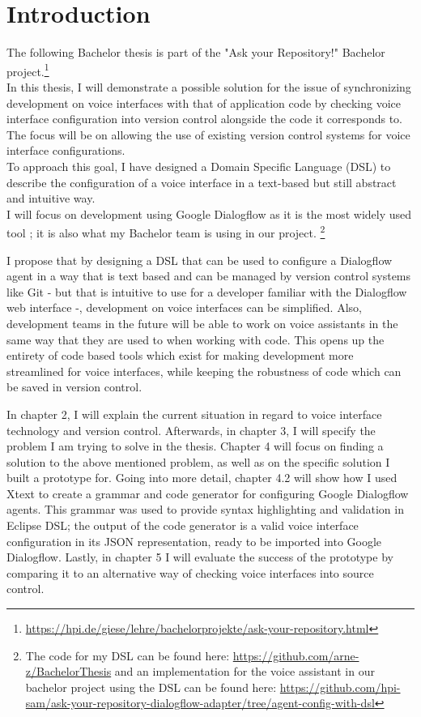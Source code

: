 
\chapter{Introduction}

The following Bachelor thesis is part of the "Ask your Repository!" Bachelor project.\footnote{\url{https://hpi.de/giese/lehre/bachelorprojekte/ask-your-repository.html}}\\
In this thesis, I will demonstrate a possible solution for the issue of synchronizing development on voice interfaces with that of application code by checking voice interface configuration into version control alongside the code it corresponds to. The focus will be on allowing the use of existing version control systems for voice interface configurations.\\
To approach this goal, I have designed a Domain Specific Language (DSL) to describe the configuration of a voice interface in a text-based but still abstract and intuitive way. \\
I will focus on development using Google Dialogflow as it is the most widely used tool \cite{Stackshare}; it is also what my Bachelor team is using in our project.
\footnote{The code for my DSL can be found here: \url{https://github.com/arne-z/BachelorThesis} and an implementation for the voice assistant in our bachelor project using the DSL can be found here: \url{https://github.com/hpi-sam/ask-your-repository-dialogflow-adapter/tree/agent-config-with-dsl}}

I propose that by designing a DSL that can be used to configure a Dialogflow agent in a way that is text based and can be managed by version control systems like Git - but that is intuitive to use for a developer familiar with the Dialogflow web interface -, development on voice interfaces can be simplified. Also, development teams in the future will be able to work on voice assistants in the same way that they are used to when working with code. This opens up the entirety of code based tools which exist for making development more streamlined for voice interfaces, while keeping the robustness of code which can be saved in version control.

In chapter 2, I will explain the current situation in regard to voice interface technology and version control. Afterwards, in chapter 3, I will specify the problem I am trying to solve in the thesis.
Chapter 4 will focus on finding a solution to the above mentioned problem, as well as on the specific solution I built a prototype for. Going into more detail, chapter 4.2 will show how I used Xtext to create a grammar and code generator for configuring Google Dialogflow agents. This grammar was used to provide syntax highlighting and validation in Eclipse DSL; the output of the code generator is a valid voice interface configuration in its JSON representation, ready to be imported into Google Dialogflow.
Lastly, in chapter 5 I will evaluate the success of the prototype by comparing it to an alternative way of checking voice interfaces into source control. 


